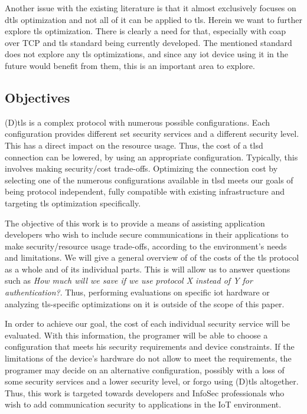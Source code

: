 \documentclass{llncs}
\begin{document}
Another issue with the existing literature is that it almost exclusively focuses on \gls{dtls} optimization
and not all of it can be applied to \gls{tls}. Herein we want to further explore \gls{tls} optimization. 
There is clearly a need for that,
especially with \gls{coap} over TCP and \gls{tls} standard\cite{I-D.ietf-core-coap-tcp-tls} being currently developed. The
mentioned standard does not explore any \gls{tls} optimizations, and since any
\gls{iot} device using it in the future would benefit from them, this is an important
area to explore.

\subsection{Objectives}

(D)\gls{tls} is a complex protocol with numerous possible configurations. Each configuration
provides different set security services and a different security level. This has a direct
impact on the resource usage. Thus, the cost of a \gls{tlsd} connection can be lowered,
by using an appropriate configuration. Typically, this involves making security/cost trade-offs.
Optimizing the connection cost by selecting one of the numerous configurations available in \gls{tlsd}
 meets our goals of being protocol independent, fully compatible with
existing infrastructure and targeting \gls{tls} optimization specifically.

The objective of this work is to provide a means of assisting application developers
who wish to include secure communications in their applications to make
security/resource usage trade-offs, according to the environment's needs
and limitations. We will give a general overview of of the costs of the \gls{tls} protocol as a whole and
of its individual parts. This is will allow us to answer questions such as \textit{How much will we save if we use protocol X instead of Y for authentication?}.
Thus, performing evaluations on specific \gls{iot} hardware or analyzing \gls{tls}-specific optimizations
on it is outside of the scope of this paper.

In order to achieve our goal, the cost of each individual security service
will be evaluated. With this information, the programer will be able to choose a configuration that
meets his security requirements and device constraints. If the limitations of the device's hardware
do not allow to meet the requirements, the programer may decide on an alternative configuration, possibly with
a loss of some security services and a lower security level, or forgo using (D)\gls{tls} altogether.
Thus, this work is targeted towards developers and InfoSec professionals who wish to add communication security
to applications in the IoT environment.
\end{document}
